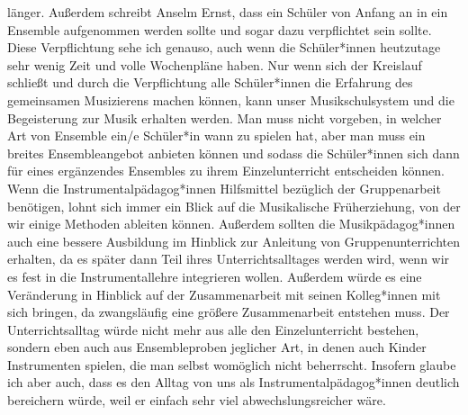 länger.\autocite[33]{losert:die_kunst_zu_unterrichten} Außerdem schreibt Anselm
Ernst, dass ein Schüler von Anfang an in ein Ensemble aufgenommen werden sollte
und sogar dazu verpflichtet sein sollte.
\autocite[61]{ernst:die_zukunftsfaehige_musikschule} Diese Verpflichtung sehe
ich genauso, auch wenn die Schüler*innen heutzutage sehr wenig Zeit und volle
Wochenpläne haben. Nur wenn sich der Kreislauf schließt und durch die
Verpflichtung alle Schüler*innen die Erfahrung des gemeinsamen Musizierens
machen können, kann unser Musikschulsystem und die Begeisterung zur Musik
erhalten werden. Man muss nicht vorgeben, in welcher Art von Ensemble ein/e
Schüler*in wann zu spielen hat, aber man muss ein breites Ensembleangebot
anbieten können und sodass die Schüler*innen sich dann für eines ergänzendes
Ensembles zu ihrem Einzelunterricht entscheiden können. Wenn die
Instrumentalpädagog*innen Hilfsmittel bezüglich der Gruppenarbeit benötigen,
lohnt sich immer ein Blick auf die Musikalische Früherziehung, von der wir
einige Methoden ableiten können. Außerdem sollten die Musikpädagog*innen auch
eine bessere Ausbildung im Hinblick zur Anleitung von Gruppenunterrichten
erhalten, da es später dann Teil ihres Unterrichtsalltages werden wird, wenn wir
es fest in die Instrumentallehre integrieren wollen. Außerdem würde es eine
Veränderung in Hinblick auf der Zusammenarbeit mit seinen Kolleg*innen mit sich
bringen, da zwangsläufig eine größere Zusammenarbeit entstehen muss. Der
Unterrichtsalltag würde nicht mehr aus alle den Einzelunterricht bestehen, sondern eben auch
aus Ensembleproben jeglicher Art, in denen auch Kinder Instrumenten spielen, die
man selbst womöglich nicht beherrscht. Insofern glaube ich aber auch, dass es
den Alltag von uns als Instrumentalpädagog*innen deutlich bereichern würde, weil
er einfach sehr viel abwechslungsreicher wäre. 













